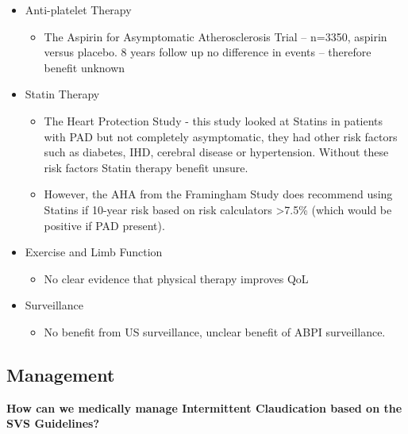 \documentclass[
]{book}
\providecommand{\tightlist}{%
  \setlength{\itemsep}{0pt}\setlength{\parskip}{0pt}}
\begin{document}
\begin{itemize}
\item
  Anti-platelet Therapy

  \begin{itemize}
  \tightlist
  \item
    The Aspirin for Asymptomatic Atherosclerosis Trial -- n=3350,
    aspirin versus placebo. 8 years follow up no difference in
    events \citep{fowkesAspirinPreventionCardiovascular2010} -- therefore
    benefit unknown
  \end{itemize}
\item
  Statin Therapy

  \begin{itemize}
  \item
    The Heart Protection Study
    \citep{heartprotectionstudycollaborativegroupRandomizedTrialEffects2007} -
    this study looked at Statins in patients with PAD but not
    completely asymptomatic, they had other risk factors such as
    diabetes, IHD, cerebral disease or hypertension. Without these
    risk factors Statin therapy benefit unsure.
  \item
    However, the AHA from the Framingham Study does recommend using
    Statins if 10-year risk based on risk calculators \textgreater7.5\% (which
    would be positive if PAD present).
  \end{itemize}
\item
  Exercise and Limb Function

  \begin{itemize}
  \tightlist
  \item
    No clear evidence that physical therapy improves QoL
  \end{itemize}
\item
  Surveillance

  \begin{itemize}
  \tightlist
  \item
    No benefit from US surveillance, unclear benefit of ABPI
    surveillance.
  \end{itemize}
\end{itemize}

\hypertarget{management-17}{%
\subsection{Management}\label{management-17}}

\textbf{How can we medically manage Intermittent Claudication based on the SVS
Guidelines?}
\end{document}
